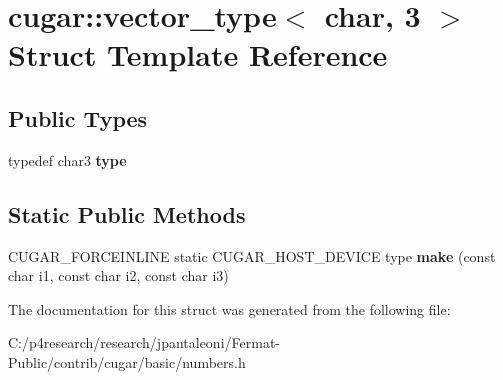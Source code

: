\hypertarget{structcugar_1_1vector__type_3_01char_00_013_01_4}{}\section{cugar\+:\+:vector\+\_\+type$<$ char, 3 $>$ Struct Template Reference}
\label{structcugar_1_1vector__type_3_01char_00_013_01_4}
\subsection*{Public Types}
\begin{DoxyCompactItemize}
\item 
\mbox{\label{structcugar_1_1vector__type_3_01char_00_013_01_4_a39d79ea105893a5c7cac64ac1ef2851a}} 
typedef char3 {\bfseries type}
\end{DoxyCompactItemize}
\subsection*{Static Public Methods}
\begin{DoxyCompactItemize}
\item 
\mbox{\label{structcugar_1_1vector__type_3_01char_00_013_01_4_a55b48a59ac62c41812c38236b51a89af}} 
C\+U\+G\+A\+R\+\_\+\+F\+O\+R\+C\+E\+I\+N\+L\+I\+NE static C\+U\+G\+A\+R\+\_\+\+H\+O\+S\+T\+\_\+\+D\+E\+V\+I\+CE type {\bfseries make} (const char i1, const char i2, const char i3)
\end{DoxyCompactItemize}


The documentation for this struct was generated from the following file\+:\begin{DoxyCompactItemize}
\item 
C\+:/p4research/research/jpantaleoni/\+Fermat-\/\+Public/contrib/cugar/basic/numbers.\+h\end{DoxyCompactItemize}
